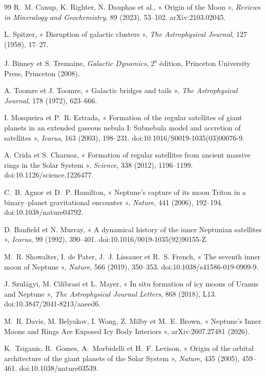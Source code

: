 \documentclass[11pt,a4paper,openany]{report}
\begin{document}
\begin{thebibliography}{99}
 R.~M. Canup, K. Righter, N. Dauphas et al., « Origin of the Moon »,
\emph{Reviews in Mineralogy and Geochemistry}, 89 (2023), 53--102. arXiv:2103.02045.

 L. Spitzer, « Disruption of galactic clusters », \emph{The Astrophysical
Journal}, 127 (1958), 17--27.

 J. Binney et S. Tremaine, \emph{Galactic Dynamics}, 2\textsuperscript{e}
édition, Princeton University Press, Princeton (2008).

 A. Toomre et J. Toomre, « Galactic bridges and tails », \emph{The
Astrophysical Journal}, 178 (1972), 623--666.


 I. Mosqueira et P.~R. Estrada, « Formation of the regular
satellites of giant planets in an extended gaseous nebula I: Subnebula model and accretion of
satellites », \emph{Icarus}, 163 (2003), 198--231. doi:10.1016/S0019-1035(03)00076-9.

 A. Crida et S. Charnoz, « Formation of regular satellites from ancient
massive rings in the Solar System », \emph{Science}, 338 (2012), 1196--1199.
doi:10.1126/science.1226477.

 C.~B. Agnor et D.~P. Hamilton, « Neptune's capture of its moon Triton
in a binary--planet gravitational encounter », \emph{Nature}, 441 (2006), 192--194.
doi:10.1038/nature04792.

 D. Banfield et N. Murray, « A dynamical history of the inner
Neptunian satellites », \emph{Icarus}, 99 (1992), 390--401.
doi:10.1016/0019-1035(92)90155-Z.

 M.~R. Showalter, I. de Pater, J.~J. Lissauer et R.~S. French, « The
seventh inner moon of Neptune », \emph{Nature}, 566 (2019), 350--353.
doi:10.1038/s41586-019-0909-9.

 J. Szulágyi, M. Cilibrasi et L. Mayer, « In situ formation of icy moons of
Uranus and Neptune », \emph{The Astrophysical Journal Letters}, 868 (2018), L13.
doi:10.3847/2041-8213/aaeed6.

 M.~R. Davis, M. Belyakov, I. Wong, Z. Milby et M.~E. Brown, « Neptune's Inner
Moons and Rings Are Exposed Icy Body Interiors », arXiv:2607.27481 (2026).


 K.~Tsiganis, R.~Gomes, A.~Morbidelli et H.~F. Levison, « Origin of the
orbital architecture of the giant planets of the Solar System », \emph{Nature}, 435 (2005),
459--461. doi:10.1038/nature03539.


\end{thebibliography}
\end{document}
